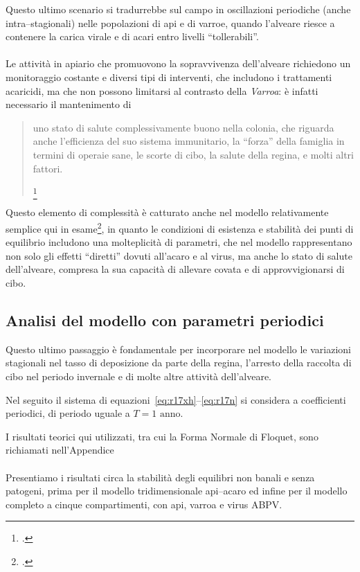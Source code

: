 Questo ultimo scenario si tradurrebbe sul campo in oscillazioni periodiche (anche intra--stagionali) nelle popolazioni
di api e di varroe, quando l'alveare riesce a contenere la carica virale e di acari entro livelli ``tollerabili''.

\paragraph{}
Le attività in apiario che promuovono la sopravvivenza dell'alveare richiedono un monitoraggio costante e diversi tipi di interventi, che includono i trattamenti acaricidi, ma che non possono limitarsi al contrasto della \emph{Varroa}: è infatti necessario il mantenimento di
\blockquote[{\footcite{privFDL}}]{\omissis uno stato di salute complessivamente buono nella colonia, che riguarda anche l'efficienza del suo sistema immunitario, la ``forza'' della famiglia in termini di operaie sane, le scorte di cibo, la salute della regina, e molti altri fattori.}

Questo elemento di complessità è catturato anche nel modello relativamente semplice qui in esame\footcite{ratti2017},
in quanto le condizioni di esistenza e stabilità dei punti di equilibrio includono una molteplicità di parametri,
che nel modello rappresentano non solo gli effetti ``diretti'' dovuti all'acaro e al virus, ma anche
lo stato di salute dell'alveare, compresa la sua capacità di allevare covata e di approvvigionarsi di cibo.


\subsection{Analisi del modello con parametri periodici}
\label{sez:paramPeriodici}
Questo ultimo passaggio è fondamentale per incorporare nel modello le variazioni stagionali nel tasso di deposizione da parte della regina, l'arresto della raccolta di cibo nel periodo invernale e di molte altre attività dell'alveare.

Nel seguito il sistema di equazioni~\eqref{eq:r17xh}--\eqref{eq:r17n} si considera a coefficienti periodici,
di periodo uguale a $T= 1 \text{ anno}$.

I risultati teorici qui utilizzati, tra cui la Forma Normale di Floquet, sono richiamati nell'Appendice

\paragraph{}
Presentiamo i risultati circa la stabilità degli equilibri non banali e senza patogeni, prima per il modello
tridimensionale api--acaro ed infine per il modello completo a cinque compartimenti, con api, varroa e virus ABPV.

